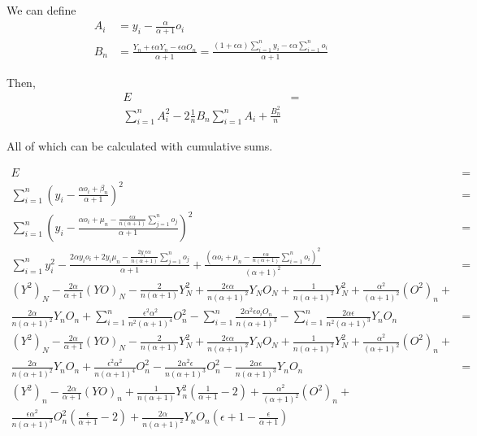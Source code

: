 \documentclass{article}
\begin{document}
We can define \begin{align*}
    A_i &= y_i - \frac{\alpha}{\alpha + 1}o_i \\
    B_n &= \frac{Y_n + \epsilon \alpha Y_n - \epsilon \alpha O_n}{\alpha + 1} = \frac{(1 + \epsilon \alpha)\sum_{i=1}^n y_i - \epsilon \alpha \sum_{i=1}^n o_i}{\alpha + 1}
\end{align*}

Then, \begin{align*}
    E &= \\
    \sum_{i=1}^n A_i^2 - 2\frac{1}{n} B_n\sum_{i=1}^n A_i + \frac{B_n^2}{n}
\end{align*}

All of which can be calculated with cumulative sums.

\begin{align*}
    E &= \\
    \sum_{i=1}^n (y_i - \frac{\alpha o_i + \beta_n}{\alpha + 1})^2 &= \\
    \sum_{i=1}^n (y_i - \frac{\alpha o_i + \mu_n - \frac{\epsilon \alpha}{n(\alpha + 1)} \sum_{j=1}^{n} o_j}{\alpha + 1})^2 &= \\
    \sum_{i=1}^{n} y_i^2 - \frac{2\alpha y_i o_i + 2y_i \mu_n - \frac{2y_i \epsilon \alpha}{n(\alpha + 1)} \sum_{j=1}^{n} o_j}{\alpha + 1} + \frac{\left( \alpha o_i + \mu_n - \frac{\epsilon \alpha }{n(\alpha + 1)} \sum_{i=1}^{n} o_i \right) ^2}{(\alpha + 1)^2} &= \\
    (Y^2)_N - \frac{2\alpha}{\alpha + 1} (YO)_N - \frac{2}{n(\alpha + 1)} Y_N^2 + \frac{2\epsilon \alpha}{n(\alpha + 1)^2} Y_NO_N + \frac{1}{n(\alpha + 1)^2} Y_N^2 + \frac{\alpha^2}{(\alpha + 1)^2} (O^2)_n + \\
    \frac{2\alpha}{n(\alpha + 1)^2} Y_nO_n + \sum_{i=1}^n \frac{\epsilon^2 \alpha^2}{n^2(\alpha + 1)^4} O_n^2 - \sum_{i=1}^n \frac{2\alpha^2 \epsilon o_i O_n}{n(\alpha + 1)^3} - \sum_{i=1}^n \frac{2\alpha \epsilon}{n^2(\alpha + 1)^3} Y_nO_n&= \\
    (Y^2)_N - \frac{2\alpha}{\alpha + 1} (YO)_N - \frac{2}{n(\alpha + 1)} Y_N^2 + \frac{2\epsilon \alpha}{n(\alpha + 1)^2} Y_NO_N + \frac{1}{n(\alpha + 1)^2}Y^2_N + \frac{\alpha^2}{(\alpha + 1)^2} (O^2)_n +  \\
    \frac{2\alpha}{n(\alpha + 1)^2} Y_nO_n + \frac{\epsilon^2 \alpha^2}{n(\alpha + 1)^4} O_n^2 - \frac{2\alpha^2 \epsilon}{n(\alpha + 1)^3} O_n^2 - \frac{2\alpha \epsilon}{n(\alpha + 1)^3} Y_nO_n&= \\
    (Y^2)_n - \frac{2\alpha}{\alpha + 1}(YO)_n + \frac{1}{n(\alpha + 1)} Y^2_n \left( \frac{1}{\alpha + 1} - 2\right) + \frac{\alpha^2}{(\alpha + 1)^2} (O^2)_n + \\
    \frac{\epsilon \alpha^2}{n(\alpha + 1)^3} O_n^2 \left( \frac{\epsilon}{\alpha + 1} - 2 \right) + \frac{2\alpha}{n(\alpha + 1)^2}Y_nO_n \left(\epsilon + 1 - \frac{\epsilon}{\alpha + 1} \right)
\end{align*}
\end{document}
